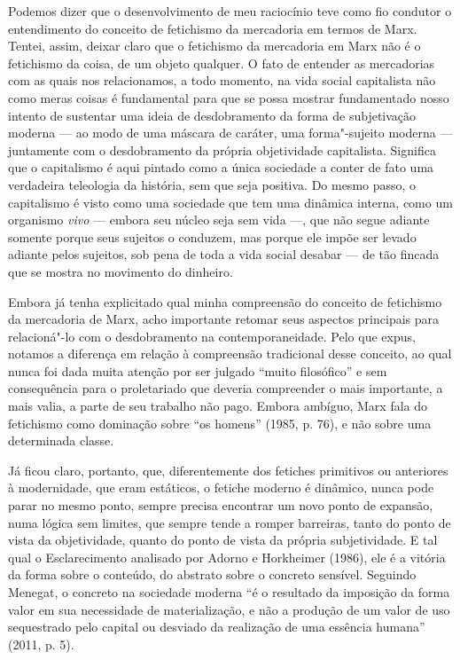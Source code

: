 Podemos dizer que o desenvolvimento de meu raciocínio teve como fio
condutor o entendimento do conceito de fetichismo da mercadoria em
termos de Marx. Tentei, assim, deixar claro que o fetichismo da
mercadoria em Marx não é o fetichismo da coisa, de um objeto qualquer. O
fato de entender as mercadorias com as quais nos relacionamos, a todo
momento, na vida social capitalista não como meras coisas é fundamental
para que se possa mostrar fundamentado nosso intento de sustentar uma
ideia de desdobramento da forma de subjetivação moderna --- ao modo de
uma máscara de caráter, uma forma"-sujeito moderna --- juntamente com o
desdobramento da própria objetividade capitalista. Significa que o
capitalismo é aqui pintado como a única sociedade a conter de fato
uma verdadeira teleologia da história, sem que seja positiva. Do mesmo
passo, o capitalismo é visto como uma sociedade que tem uma dinâmica
interna, como um organismo \emph{vivo} --- embora seu núcleo seja sem
vida ---, que não segue adiante somente porque seus sujeitos o conduzem,
mas porque ele impõe ser levado adiante pelos sujeitos, sob pena de toda
a vida social desabar --- de tão fincada que se mostra no movimento do
dinheiro.

Embora já tenha explicitado qual minha compreensão do conceito de
fetichismo da mercadoria de Marx, acho importante retomar seus
aspectos principais para relacioná"-lo com o desdobramento na
contemporaneidade. Pelo que expus, notamos a diferença em relação à
compreensão tradicional desse conceito, ao qual nunca foi dada muita
atenção por ser julgado ``muito filosófico'' e sem consequência para o
proletariado que deveria compreender o mais importante, a mais valia, a
parte de seu trabalho não pago. Embora ambíguo, Marx fala do fetichismo
como dominação sobre ``os homens'' (1985, p. 76), e não sobre uma
determinada classe.

Já ficou claro, portanto, que, diferentemente dos fetiches primitivos
ou anteriores à modernidade, que eram estáticos, o fetiche moderno é
dinâmico, nunca pode parar no mesmo ponto, sempre precisa encontrar um
novo ponto de expansão, numa lógica sem limites, que sempre tende a
romper barreiras, tanto do ponto de vista da objetividade, quanto do
ponto de vista da própria subjetividade. E tal qual o Esclarecimento
analisado por Adorno e Horkheimer (1986), ele é a vitória da forma sobre
o conteúdo, do abstrato sobre o concreto sensível. Seguindo Menegat, o
concreto na sociedade moderna ``é o resultado da imposição da forma
valor em sua necessidade de materialização, e não a produção de um valor
de uso sequestrado pelo capital ou desviado da realização de uma
essência humana'' (2011, p. 5).


